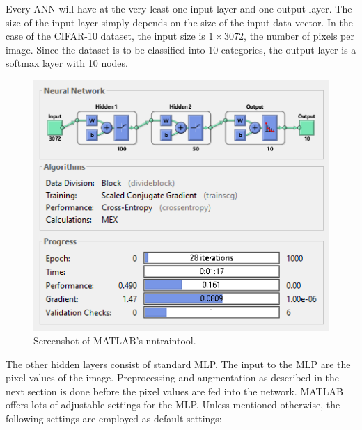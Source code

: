 Every ANN will have at the very least one input layer and one output layer. The size of the input layer simply depends on the size of the input data vector. In the case of the CIFAR-10 dataset, the input size is $1\times3072$, the number of pixels per image. Since the dataset is to be classified into 10 categories, the output layer is a softmax layer with 10 nodes.

\begin{figure}[h!]
  	\centering
  	\includegraphics{images/NNtool}
  	\caption{Screenshot of MATLAB's nntraintool.}
  	\label{fig:NNtool}
\end{figure}

The other hidden layers consist of standard MLP. The input to the MLP are the pixel values of the image. Preprocessing and augmentation as described in the next section is done before the pixel values are fed into the network. MATLAB offers lots of adjustable settings for the MLP. Unless mentioned otherwise, the following settings are employed as default settings:

